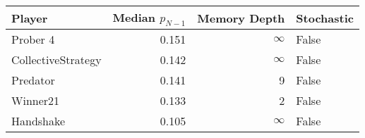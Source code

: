 \begin{tabular}{lrrl}
\toprule
             Player &  Median $p_{N-1}$ &  Memory Depth & Stochastic \\
\midrule
           Prober 4 &             0.151 &            \(\infty\) &      False \\
 CollectiveStrategy &             0.142 &            \(\infty\) &      False \\
           Predator &             0.141 &             9 &      False \\
           Winner21 &             0.133 &             2 &      False \\
          Handshake &             0.105 &            \(\infty\) &      False \\
\bottomrule
\end{tabular}
